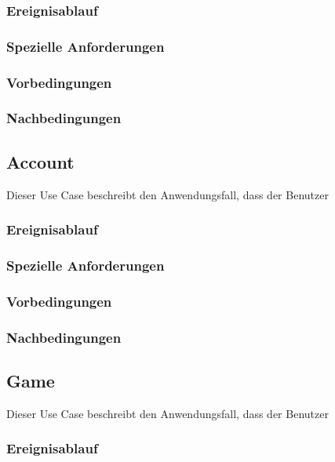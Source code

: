 		\subsubsection{Ereignisablauf}
			
		\subsubsection{Spezielle Anforderungen}		
			
		\subsubsection{Vorbedingungen}
			
		\subsubsection{Nachbedingungen}
	
	\subsection{Account}
		Dieser Use Case beschreibt den Anwendungsfall, dass der Benutzer 
			
		\subsubsection{Ereignisablauf}
			
		\subsubsection{Spezielle Anforderungen}		
			
		\subsubsection{Vorbedingungen}
			
		\subsubsection{Nachbedingungen}
	
	\subsection{Game}
		Dieser Use Case beschreibt den Anwendungsfall, dass der Benutzer 
			
		\subsubsection{Ereignisablauf}
			
